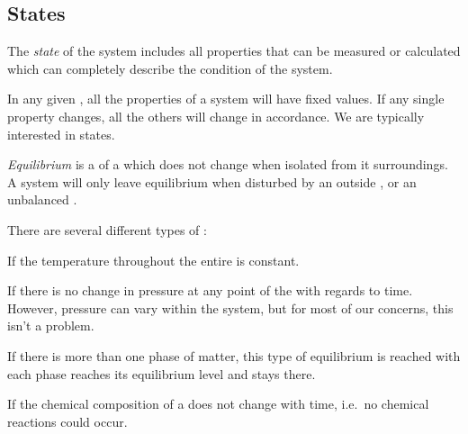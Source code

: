 \subsection{States}\label{subsec:States}
\begin{definition}[State]\label{def:State}
  The \emph{state} of the system includes all properties that can be measured or calculated which can completely describe the condition of the system.
\end{definition}

In any given , all the properties of a system will have fixed values.
If any single property changes, all the others will change in accordance.
We are typically interested in  states.

\begin{definition}[Equilibrium]\label{def:Equilibrium}
  \emph{Equilibrium} is a  of a  which does not change when isolated from it surroundings.
  A system will only leave equilibrium when disturbed by an outside , or an unbalanced .
\end{definition}

There are several different types of :
\begin{description}[noitemsep]
\item[Thermal Equilibrium] If the temperature throughout the entire  is constant.
\item[Mechanical Equilibrium] If there is no change in pressure at any point of the  with regards to time.
  However, pressure can vary within the system, but for most of our concerns, this isn't a problem.
\item[Phase Equilibrium] If there is more than one phase of matter, this type of equilibrium is reached with each phase reaches its equilibrium level and stays there.
\item[Chemical Equilibrium] If the chemical composition of a  does not change with time, i.e.\ no chemical reactions could occur.
\end{description}


